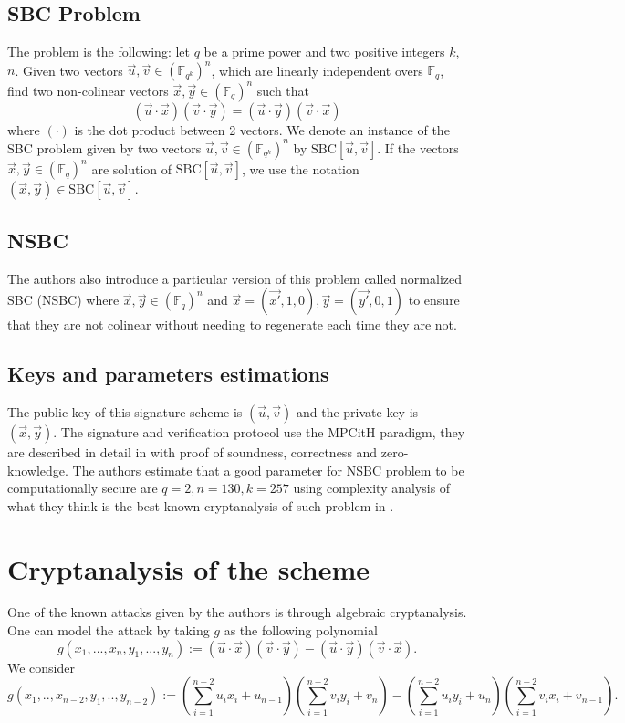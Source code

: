 \documentclass[english]{article}
\begin{document}
		\subsection{SBC Problem}
		The problem is the following: let $q$ be a prime power and two positive integers $k$, $n$.
		\newline
		Given two vectors $\vec{u}, \vec{v} \in (\mathbb{F}_{q^k})^n$, which are linearly independent overs $\mathbb{F}_q$, find two non-colinear vectors $\vec{x}, \vec{y} \in (\mathbb{F}_q)^n$ such that $$(\vec{u} \cdot \vec{x})(\vec{v} \cdot \vec{y}) = (\vec{u} \cdot \vec{y})(\vec{v} \cdot \vec{x})$$
		where $(\cdot)$ is the dot product between 2 vectors.
		We denote an instance of the SBC problem given by two vectors $\vec{u}, \vec{v} \in (\mathbb{F}_{q^k})^n$ by $\text{SBC}[\vec{u}, \vec{v}]$. If the vectors $\vec{x},\vec{y} \in (\mathbb{F}_q)^n$ are solution of $\text{SBC}[\vec{u},\vec{v}]$, we use the notation $(\vec{x}, \vec{y}) \in \text{SBC}[\vec{u}, \vec{v}]$.
		
		\subsection{NSBC}
		
		The authors also introduce a particular version of this problem called normalized SBC (NSBC) where $\vec{x}, \vec{y} \in (\mathbb{F}_q)^n$ and
		$\vec{x} = (\vec{x'}, 1, 0), \vec{y} = (\vec{y'}, 0, 1)$ to ensure that they are not colinear without needing to regenerate each time they are not.
 		
 		\subsection{Keys and parameters estimations}
		The public key of this signature scheme is $(\vec{u},\vec{v})$ and the private key is $(\vec{x}, \vec{y})$.
		The signature and verification protocol use the MPCitH paradigm, they are described in detail in \cite{HJ23} with proof of soundness, correctness and zero-knowledge.
		The authors estimate that a good parameter for NSBC problem to be computationally secure are $q = 2, n = 130, k = 257$ using complexity analysis of what they think is the best known cryptanalysis of such problem in \cite{FSS11}.
		
		\section{Cryptanalysis of the scheme}
		One of the known attacks given by the authors is through algebraic cryptanalysis.
		One can model the attack by taking $g$ as the following polynomial
		$$
		g(x_1,...,x_n,y_1,...,y_n) := (\vec{u} \cdot \vec{x})(\vec{v} \cdot \vec{y}) - (\vec{u} \cdot \vec{y})(\vec{v} \cdot \vec{x}).
		$$
		We consider
		$$
		g(x_1,..,x_{n-2},y_1,..,y_{n-2}) := (\sum_{i = 1}^{n-2}u_{i}x_{i} + u_{n-1})(\sum_{i = 1}^{n-2}v_{i}y_{i} + v_{n}) - (\sum_{i = 1}^{n-2}u_{i}y_{i} + u_{n})(\sum_{i = 1}^{n-2}v_{i}x_{i} + v_{n-1}).
		$$
		
\end{document}
